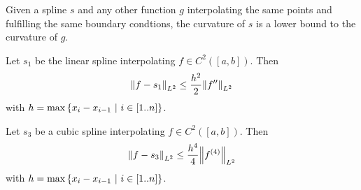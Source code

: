 \begin{theorem}
	Given a spline $s$ and any other function $g$ interpolating the same points and fulfilling the same boundary condtions, the curvature of $s$ is a lower bound to the curvature of $g$.
\end{theorem}
\begin{theorem}
	Let $s_1$ be the linear spline interpolating $f \in C^2([a,b])$. Then
	\begin{align*}
		\norm{f - s_1}_{L^2} \leq \frac{h^2}{2}\norm{f''}_{L^2}
	\end{align*}
	with $h = \max\qty{x_i - x_{i-1} ~\middle|~i \in [1..n]}$.
\end{theorem}
\begin{theorem}
	Let $s_3$ be a cubic spline interpolating $f \in C^2([a,b])$. Then
	\begin{align*}
		\norm{f - s_3}_{L^2} \leq \frac{h^4}{4}\norm{f^{(4)}}_{L^2}
	\end{align*}
	with $h = \max\qty{x_i - x_{i-1} ~\middle|~i \in [1..n]}$.
\end{theorem}
